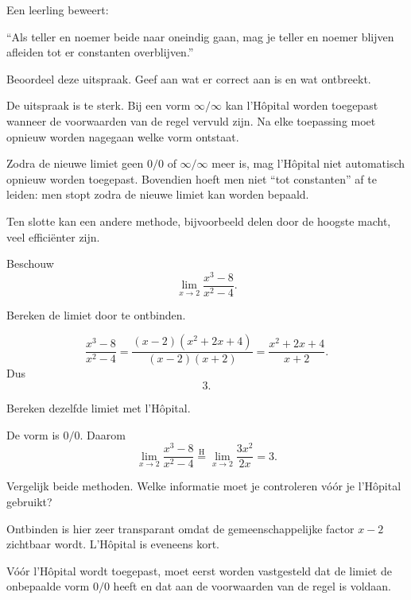 \documentclass{ximera}
\begin{document}
\begin{oefening}{\oefG}

Een leerling beweert:

\begin{center}
``Als teller en noemer beide naar oneindig gaan, mag je teller en
noemer blijven afleiden tot er constanten overblijven.''
\end{center}

Beoordeel deze uitspraak. Geef aan wat er correct aan is en wat ontbreekt.

\begin{oplossing}
De uitspraak is te sterk. Bij een vorm \(\infty/\infty\) kan l'Hôpital
worden toegepast wanneer de voorwaarden van de regel vervuld zijn. Na
elke toepassing moet opnieuw worden nagegaan welke vorm ontstaat.

Zodra de nieuwe limiet geen \(0/0\) of \(\infty/\infty\) meer is, mag
l'Hôpital niet automatisch opnieuw worden toegepast. Bovendien hoeft men
niet ``tot constanten'' af te leiden: men stopt zodra de nieuwe limiet
kan worden bepaald.

Ten slotte kan een andere methode, bijvoorbeeld delen door de hoogste
macht, veel efficiënter zijn.
\end{oplossing}
\end{oefening}

\begin{oefening}{\oefG}

Beschouw
\[\lim_{x\to2}\frac{x^3-8}{x^2-4}.\]

\begin{question}
Bereken de limiet door te ontbinden.

\begin{oplossing}
\[
\frac{x^3-8}{x^2-4}
=\frac{(x-2)(x^2+2x+4)}{(x-2)(x+2)}
=\frac{x^2+2x+4}{x+2}.
\]
Dus
\[\boxed{3}.\]
\end{oplossing}
\end{question}

\begin{question}
Bereken dezelfde limiet met l'Hôpital.

\begin{oplossing}
De vorm is \(0/0\). Daarom
\[\lim_{x\to2}\frac{x^3-8}{x^2-4}\overset{\mathrm H}{=}\lim_{x\to2}\frac{3x^2}{2x}=3.\]
\end{oplossing}
\end{question}

\begin{question}
Vergelijk beide methoden. Welke informatie moet je controleren vóór je
l'Hôpital gebruikt?

\begin{oplossing}
Ontbinden is hier zeer transparant omdat de gemeenschappelijke factor
\(x-2\) zichtbaar wordt. L'Hôpital is eveneens kort.

Vóór l'Hôpital wordt toegepast, moet eerst worden vastgesteld dat de
limiet de onbepaalde vorm \(0/0\) heeft en dat aan de voorwaarden van de
regel is voldaan.
\end{oplossing}
\end{question}
\end{oefening}



\FVDendExercises
\end{document}
